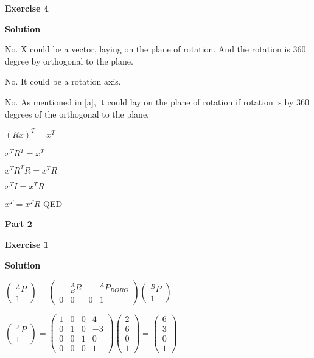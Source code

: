 \documentclass[12pt]{article}
\begin{document}
\textbf{Exercise 4}		
		
\textbf{Solution}

\medskip

\begin{list}{()~}{}
\item 
No. X could be a vector, laying on the plane of rotation. And the rotation is 360 degree by orthogonal to the plane. 
\item
No. It could be a rotation axis.
\item
No. As mentioned in [a], it could lay on the plane of rotation if rotation is by 360 degrees of the orthogonal to the plane.  
\item
$(Rx)^T=x^T$

$x^T R^T = x^T$

$x^T R^T R = x^T R$

$x^T I = x^T R$

$x^T = x^T R$ QED
\end{list}

\textbf{Part 2}	

\bigskip

\textbf{Exercise 1}		
		
\textbf{Solution}

\medskip

$\left(\begin{array}{c}
^AP \\
1\end{array}\right) =  \left(\begin{array}{cccc}
\ & _{B}^AR & \ &^AP_{BORG} \\
0 & 0 & 0 & 1  \end{array}\right)\left(\begin{array}{c}
^BP \\
1\end{array}\right)$

$\left(\begin{array}{c}
^AP \\
1\end{array}\right) =  \left(\begin{array}{cccc}
1 & 0 & 0 & 4 \\
0 & 1 & 0 & -3 \\
0 & 0 & 1 & 0\\
0 & 0 & 0 & 1  \end{array}\right)\left(\begin{array}{c}
2 \\
6\\
0\\
1\end{array}\right)=\left(\begin{array}{c}
6 \\
3\\
0\\
1\end{array}\right)$
\end{document}
